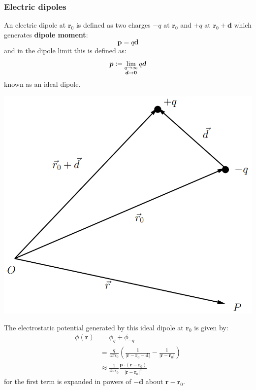 \documentclass{article}
\newcommand{\deq}{\vcentcolon=}
\newcommand{\vc}[1]{\boldsymbol{#1}}
\begin{document}
\begin{multicols*}{3}
\subsubsection*{Electric dipoles}
An electric dipole at $\vc{r}_0$ is defined as two charges
$-q$ at $\vc{r}_0$ and $+q$ at $\vc{r}_0+\vc{d}$
which generates \textbf{dipole moment}:
$$\vc{p}=q\vc{d}$$
and in the \underline{dipole limit} this is defined as:
$$\vc{p}\deq\lim\limits_{\substack{
    q \to \infty \\
    \vc{d} \to \vc{0}}} q\vc{d}$$
known as an ideal dipole.
\begin{center}
    \includegraphics[scale=0.22]{f02.png}
\end{center}

The electrostatic potential
generated by this ideal dipole at $\vc{r}_0$ is given by:
\begin{align*}
    \phi(\vc{r})
    &=\phi_{q}+\phi_{-q} \\
    &=\frac{q}{4\pi\epsilon_0}\left(
    \frac{1}{|\vc{r}-\vc{r}_0-\vc{d}|}
    -\frac{1}{|\vc{r}-\vc{r}_0|}\right) \\
    &\approx\frac{1}{4\pi\epsilon_0}
    \frac{\vc{p}\cdot(\vc{r}-\vc{r}_0)}{|\vc{r}-\vc{r}_0|^3}
\end{align*}
for the first term is expanded in powers of $-\vc{d}$
about $\vc{r}-\vc{r}_0$. 


\end{multicols*}
\end{document}
